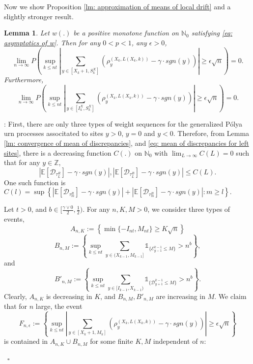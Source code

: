 \documentclass[twoside,12pt,a4paper]{article}
\newtheorem{lemma}{Lemma}[section]
\numberwithin{equation}{section}
\newenvironment{proof}{{\sc Proof}:}{~\hfill $\square$}
\newcommand{\abs}[1]{\left\vert #1 \right\vert}
\begin{document}
Now we show Proposition \ref{lm: approximation of means of local drift} and a slightly stronger result. 
\begin{lemma}
	Let $w(.)$ be a positive monotone function on $\mathbb{N}_0$ satisfying \eqref{eq: asymptotics of w}. Then for any $0<p<1$, any $\epsilon>0$,
	$$
	\lim_{n\to\infty} P\left( \sup_{k\leq n t}  \abs{  	\sum_{y\in [X_{k}+1 ,S_{k}^X]} \left( \rho^{(X_k,L(X_k,k))}_y -  \gamma \cdot sgn(y) \right) } \geq  \epsilon \sqrt{n}     \right) =0.
	$$
	Furthermore,
		$$
	\lim_{n\to\infty} P\left( \sup_{k\leq n t}  \abs{  	\sum_{y\in [I_k^{X} ,S_{k}^X]} \left( \rho^{(X_k,L(X_k,k))}_y -  \gamma \cdot sgn(y) \right) } \geq  \epsilon \sqrt{n}     \right) =0.
	$$
\end{lemma}
\begin{proof} First, there are only three types of weight sequences for the generalized P\'{o}lya urn processes associtated to sites $y>0$, $y=0$ and $y<0$. Therefore, from Lemma \ref{lm: convergence of mean of discrepancies}, and \eqref{eq: mean of discrepancies for left sites}, there is a decreasing function $C(.)$ on $\mathbb{N}_0$ with $\lim_{L\to \infty}C(L) =0$ such that for any $y \in \mathbb{Z}$,
	\begin{equation}\label{eq: uniform convergence}
		\abs{\mathbb{E}\left[ \mathcal{D}_{\tau_L^R} \right] - \gamma \cdot sgn(y)}, \abs{\mathbb{E}\left[ \mathcal{D}_{\tau_L^B} \right] - \gamma \cdot sgn(y)} \leq C(L).
	\end{equation} One such function is $C(l) = \sup \left\{  \abs{\mathbb{E}\left[ \mathcal{D}_{\tau_m^R} \right] - \gamma \cdot sgn(y)} + \abs{\mathbb{E}\left[ \mathcal{D}_{\tau_m^B} \right] - \gamma \cdot sgn(y)} : m\geq l \right\}.     $  
	
	
	Let $t>0$, and $b \in [\frac{\gamma \vee 0 }{2},\frac{1}{2})$.  For any $n,K,M>0$, we consider three types of events, 
	$$A_{n,K}:=\left\{ \min\{-I_{nt}, M_{nt}\} \geq K \sqrt{n}  \right\}$$
	$$B_{n,M}:= \left\{  \sup_{k\leq n t} \sum_{ y\in (X_{k-1}, M_{k-1}]}  \mathbb{1}_{\{ \mathcal{E}^{k-1}_{y-1} \leq M  \}} >n^b  \right\},  $$
	and 
	$$B'_{n,M}:=  \left\{  \sup_{k\leq n t} \sum_{ y\in [I_{k-1}, X_{k-1})}  \mathbb{1}_{\{ \mathcal{D}^{k-1}_{y+1} \leq M  \}} >n^b  \right\}.$$
Clearly, $A_{n,K}$ is decreasing in $K$, and $B_{n,M}, B'_{n,M}$ are increasing in $M$. We claim that for $n$ large, the event 
$$
F_{n,\epsilon}:= \left\{ \sup_{k\leq n t}  \abs{  	\sum_{y\in [X_{k}+1 ,M_k]} \left( \rho^{(X_k,L(X_k,k))}_y -  \gamma \cdot sgn(y) \right) } \geq  \epsilon \sqrt{n}    \right \}$$ is contained in $A_{n,K} \cup B_{n,M} $ for some finite $K, M$ independent of $n$:   


\end{proof}
\end{document}
